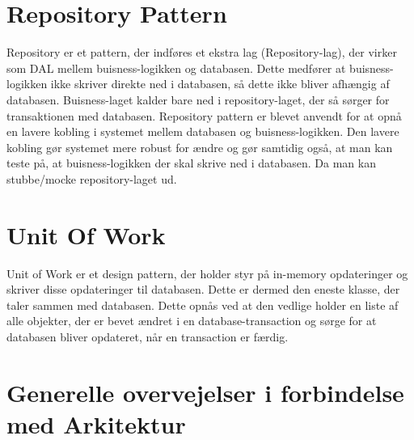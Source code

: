 \section{Repository Pattern}
Repository er et pattern, der indføres et ekstra lag (Repository-lag), der virker som DAL mellem buisness-logikken og databasen. Dette medfører at buisness-logikken ikke skriver direkte ned i databasen, så dette ikke bliver afhængig af databasen. Buisness-laget kalder bare ned i repository-laget, der så sørger for transaktionen med databasen. 
Repository pattern er blevet anvendt for at opnå en lavere kobling i systemet mellem databasen og buisness-logikken. Den lavere kobling gør systemet mere robust for ændre og gør samtidig også, at man kan teste på, at buisness-logikken der skal skrive ned i databasen. Da man kan stubbe/mocke repository-laget ud.

\section{Unit Of Work}
Unit of Work er et design pattern, der holder styr på in-memory opdateringer og skriver disse opdateringer til databasen. Dette er dermed den eneste klasse, der taler sammen med databasen.
Dette opnås ved at den vedlige holder en liste af alle objekter, der er bevet ændret i en database-transaction og sørge for at databasen bliver opdateret, når en transaction er færdig.

\section{Generelle overvejelser i forbindelse med Arkitektur}